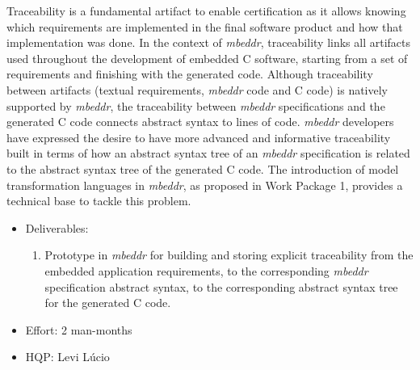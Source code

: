 Traceability is a fundamental artifact to enable certification as it allows
knowing which requirements are implemented in the final software product and how
that implementation was done. In the context of \emph{mbeddr}, traceability links all
artifacts used throughout the development of embedded C software, starting from
a set of requirements and finishing with the generated code. Although
traceability between artifacts (textual requirements, \emph{mbeddr} code and C code) is
natively supported by \emph{mbeddr}, the traceability between \emph{mbeddr} specifications and
the generated C code connects abstract syntax to lines of code. \emph{mbeddr}
developers have expressed the desire to have more advanced and informative
traceability built in terms of how an abstract syntax tree of an \emph{mbeddr}
specification is related to the abstract syntax tree of the generated C code.
The introduction of model transformation languages in \emph{mbeddr}, as proposed in
Work Package 1, provides a technical base to tackle this problem.

\begin{itemize}
  \item Deliverables:
  \begin{enumerate}
    \item Prototype in \emph{mbeddr} for building and storing explicit traceability
    from the embedded application requirements, to the corresponding \emph{mbeddr}
    specification abstract syntax, to the corresponding abstract syntax tree for
    the generated C code.
  \end{enumerate}
  \item Effort: 2 man-months
  \item HQP: Levi L\'ucio
\end{itemize}
